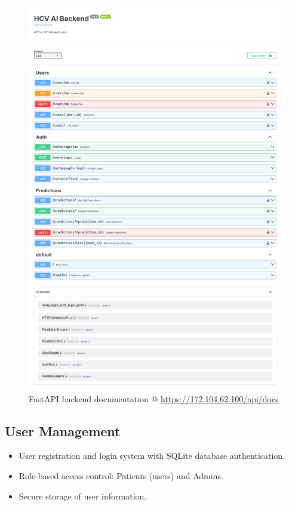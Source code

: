 \begin{figure}[htbp]
  \begin{center}
    \includegraphics[width=\textwidth]{figures/site/backend-api.png}
  \end{center}
  \caption{FastAPI backend documentation @ \url{https://172.104.62.100/api/docs}}\label{fig:backend-api}
\end{figure}


\subsection*{User Management}
\begin{itemize}
    \item User registration and login system with SQLite database authentication.
    \item Role-based access control: Patients (users) and Admins.
    \item Secure storage of user information.
\end{itemize}
